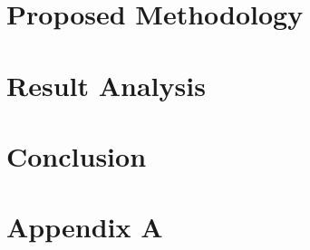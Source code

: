 \documentclass[Times,12pt,oneside,openany,print,index]{report}
\begin{document}
\chapter{Proposed Methodology}


\chapter{Result Analysis}


\chapter{Conclusion}


{}


\appendix
\setcounter{chapter}{1}%
{}
\chapter*{Appendix A}
\label{app:combined}
\renewcommand{\thesection}{\thechapter.\arabic{section}}
\setcounter{section}{0}

\end{document}
